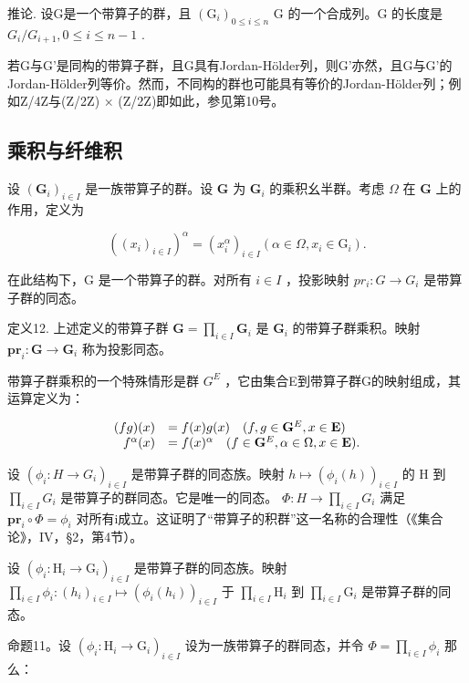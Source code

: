 推论. 设G是一个带算子的群，且 \((\mathrm{G}_{i})_{0\leqslant i\leqslant n}\) G 的一个合成列。G 的长度是 \(G_{i}/G_{i+1}, 0 \leqslant i \leqslant n - 1\) .

若G与G'是同构的带算子群，且G具有Jordan-Hölder列，则G'亦然，且G与G'的Jordan-Hölder列等价。然而，不同构的群也可能具有等价的Jordan-Hölder列；例如Z/4Z与(Z/2Z) × (Z/2Z)即如此，参见第10号。

\subsection{乘积与纤维积}

设 \((\mathbf{G}_i)_{i\in I}\) 是一族带算子的群。设 \(\mathbf{G}\) 为 \(\mathbf{G}_i\) 的乘积幺半群。考虑 \(\Omega\) 在 \(\mathbf{G}\) 上的作用，定义为

\[
((x _ {i}) _ {i \in I}) ^ {\alpha} = (x _ {i} ^ {\alpha}) _ {i \in I} (\alpha \in \Omega , x _ {i} \in \mathrm{G} _ {i}).
\]

在此结构下，G 是一个带算子的群。对所有 \(i \in I\) ，投影映射 \(pr_{i}: G \to G_{i}\) 是带算子群的同态。

定义12. 上述定义的带算子群 \(\mathbf{G} = \prod_{i\in I}\mathbf{G}_i\) 是 \(\mathbf{G}_i\) 的带算子群乘积。映射 \(\mathbf{pr}_i\colon \mathbf{G}\to \mathbf{G}_i\) 称为投影同态。

带算子群乘积的一个特殊情形是群 \(G^{E}\) ，它由集合E到带算子群G的映射组成，其运算定义为：

\[
\begin{array}{r l} (f g) (x) & = f (x) g (x) \quad (f, g \in \mathbf {G} ^ {E}, x \in \mathbf {E}) \\ f ^ {\alpha} (x) & = f (x) ^ {\alpha} \quad (f \in \mathbf {G} ^ {E}, \alpha \in \Omega , x \in \mathbf {E}). \end{array}
\]

设 \((\phi_{i} \colon H \to G_{i})_{i \in I}\) 是带算子群的同态族。映射 \(h \mapsto (\phi_{i}(h))_{i \in I}\) 的 H 到 \(\prod_{i \in I} G_{i}\) 是带算子的群同态。它是唯一的同态。 \(\Phi \colon H \to \prod_{i \in I} G_{i}\) 满足 \(\mathbf{pr}_{i} \circ \Phi = \phi_{i}\) 对所有i成立。这证明了“带算子的积群”这一名称的合理性（《集合论》，IV，§2，第4节）。

设 \((\phi_i: \mathrm{H}_i \to \mathrm{G}_i)_{i \in I}\) 是带算子群的同态族。映射 \(\prod_{i \in I} \phi_i: (h_i)_{i \in I} \mapsto (\phi_i(h_i))_{i \in I}\) 于 \(\prod_{i \in I} \mathrm{H}_i\) 到 \(\prod_{i \in I} \mathrm{G}_i\) 是带算子群的同态。

命题11。设 \((\phi_i: \mathrm{H}_i \to \mathrm{G}_i)_{i \in I}\) 设为一族带算子的群同态，并令 \(\Phi = \prod_{i \in I} \phi_i\) 那么：


